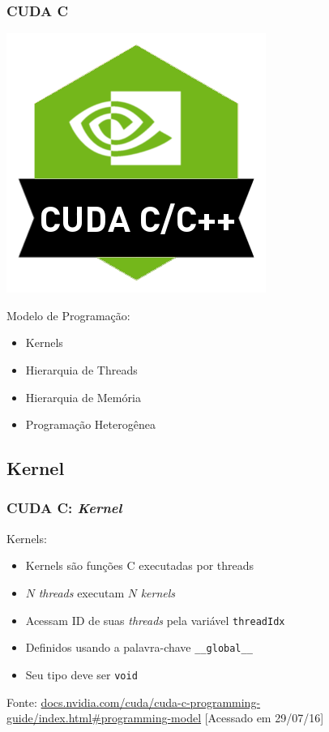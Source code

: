 \documentclass[10pt, compress]{beamer}
\begin{document}
\begin{frame}
    \frametitle{CUDA C}
    \begin{center}
        \includegraphics[width=.3\textwidth]{cuda-c}
    \end{center}

    \pause
    Modelo de Programação:
    \pause
    \begin{itemize}
        \item \alert{Kernels}
            \pause
        \item Hierarquia de \alert{Threads}
            \pause
        \item Hierarquia de \alert{Memória}
            \pause
        \item Programação \alert{Heterogênea}
    \end{itemize}
\end{frame}

\subsection{Kernel}

\begin{frame}
    \frametitle{CUDA C: \textit{Kernel}}
    \alert{Kernels}:
    \begin{itemize}
        \item \alert{Kernels} são funções C executadas por \alert{threads}
        \item $N$ \textit{threads} executam $N$ \textit{kernels}
            \pause
        \item Acessam \alert{ID} de suas \textit{threads} pela variável \alert{\texttt{threadIdx}}
            \pause
        \item Definidos usando a palavra-chave \alert{\texttt{\_\_global\_\_}}
        \item Seu tipo deve ser \alert{\texttt{void}}
    \end{itemize}

    \vfill

    \begin{center}
        \tiny{Fonte: \url{docs.nvidia.com/cuda/cuda-c-programming-guide/index.html\#programming-model} [Acessado em 29/07/16]}
    \end{center}
\end{frame}
\end{document}
